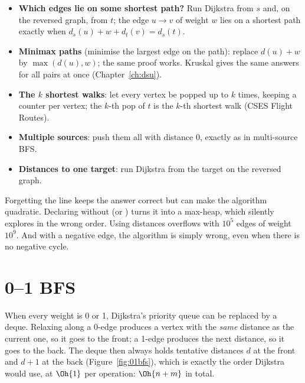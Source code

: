 \begin{trick}
\begin{itemize}
  \item \textbf{Which edges lie on some shortest path?} Run Dijkstra from $s$ and, on the reversed graph, from $t$; the edge
        $u \to v$ of weight $w$ lies on a shortest path exactly when $d_s(u) + w + d_t(v) = d_s(t)$.
  \item \textbf{Minimax paths} (minimise the largest edge on the path): replace $d(u) + w$ by $\max(d(u), w)$; the same proof
        works. Kruskal gives the same answers for all pairs at once (Chapter~\ref{ch:dsu}).
  \item \textbf{The $k$ shortest walks}: let every vertex be popped up to $k$ times, keeping a counter per vertex; the $k$-th
        pop of $t$ is the $k$-th shortest walk (CSES Flight Routes).
  \item \textbf{Multiple sources}: push them all with distance 0, exactly as in multi-source BFS.
  \item \textbf{Distances to one target}: run Dijkstra from the target on the reversed graph.
\end{itemize}
\end{trick}

\begin{pitfall}
Forgetting the  line keeps the answer correct but can make the algorithm quadratic.
Declaring  without  (or ) turns it into a max-heap, which silently explores in
the wrong order. Using  distances overflows with $10^5$ edges of weight $10^9$. And with a negative edge, the algorithm
is simply wrong, even when there is no negative cycle.
\end{pitfall}

\section[0--1 BFS]{0--1 BFS \hfill \gold}\label{sec:01bfs}

When every weight is 0 or 1, Dijkstra's priority queue can be replaced by a deque. Relaxing along a 0-edge produces a vertex
with the \emph{same} distance as the current one, so it goes to the front; a 1-edge produces the next distance, so it goes to the
back. The deque then always holds tentative distances $d$ at the front and $d + 1$ at the back (Figure~\ref{fig:01bfs}), which is
exactly the order Dijkstra would use, at $\Oh{1}$ per operation: $\Oh{n + m}$ in total.

